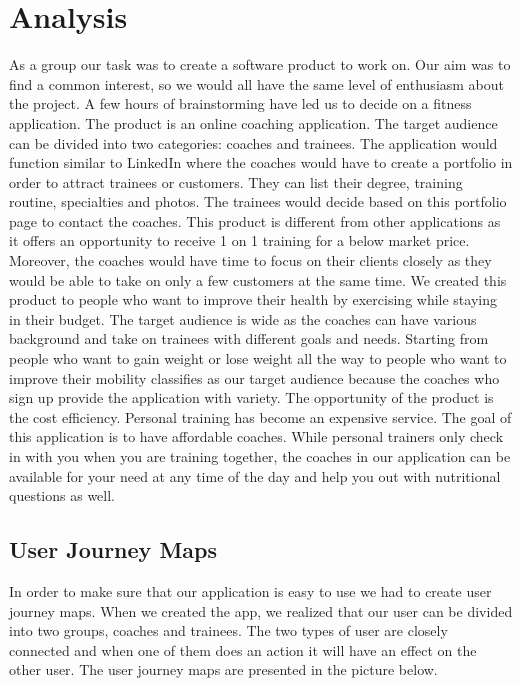 \section{Analysis}

As a group our task was to create a software product to work on. Our aim was to find a common interest, so we would all have the same level of enthusiasm about the project. A few hours of brainstorming have led us to decide on a fitness application. 
The product is an online coaching application. The target audience can be divided into two categories: coaches and trainees. The application would function similar to LinkedIn where the coaches would have to create a portfolio in order to attract trainees or customers. They can list their degree, training routine, specialties and photos. The trainees would decide based on this portfolio page to contact the coaches.
This product is different from other applications as it offers an opportunity to receive 1 on 1 training for a below market price. Moreover, the coaches would have time to focus on their clients closely as they would be able to take on only a few customers at the same time.
We created this product to people who want to improve their health by exercising while staying in their budget. The target audience is wide as the coaches can have various background and take on trainees with different goals and needs. Starting from people who want to gain weight or lose weight all the way to people who want to improve their mobility classifies as our target audience because the coaches who sign up provide the application with variety.
The opportunity of the product is the cost efficiency. Personal training has become an expensive service. The goal of this application is to have affordable coaches. While personal trainers only check in with you when you are training together, the coaches in our application can be available for your need at any time of the day and help you out with nutritional questions as well.

\subsection{User Journey Maps}
In order to make sure that our application is easy to use we had to create user journey maps. When we created the app, we realized that our user can be divided into two groups, coaches and trainees. The two types of user are closely connected and when one of them does an action it will have an effect on the other user. The user journey maps are presented in the picture below.

